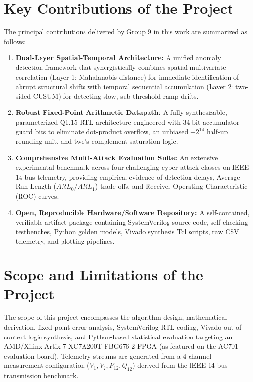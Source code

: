 \documentclass[11pt,a4paper]{report}
\begin{document}
\section{Key Contributions of the Project}
The principal contributions delivered by Group 9 in this work are summarized as follows:
\begin{enumerate}
    \item \textbf{Dual-Layer Spatial-Temporal Architecture:} A unified anomaly detection
    framework that synergistically combines spatial multivariate correlation (Layer 1:
    Mahalanobis distance) for immediate identification of abrupt structural shifts with
    temporal sequential accumulation (Layer 2: two-sided CUSUM) for detecting slow,
    sub-threshold ramp drifts.
    \item \textbf{Robust Fixed-Point Arithmetic Datapath:} A fully synthesizable,
    parameterized Q1.15 RTL architecture engineered with 34-bit accumulator guard bits
    to eliminate dot-product overflow, an unbiased $+2^{14}$ half-up rounding unit, and
    two's-complement saturation logic.
    \item \textbf{Comprehensive Multi-Attack Evaluation Suite:} An extensive experimental
    benchmark across four challenging cyber-attack classes on IEEE 14-bus telemetry,
    providing empirical evidence of detection delays, Average Run Length ($ARL_0/ARL_1$)
    trade-offs, and Receiver Operating Characteristic (ROC) curves.
    \item \textbf{Open, Reproducible Hardware/Software Repository:} A self-contained,
    verifiable artifact package containing SystemVerilog source code, self-checking
    testbenches, Python golden models, Vivado synthesis Tcl scripts, raw CSV telemetry,
    and plotting pipelines.
\end{enumerate}

\section{Scope and Limitations of the Project}
The scope of this project encompasses the algorithm design, mathematical derivation,
fixed-point error analysis, SystemVerilog RTL coding, Vivado out-of-context logic
synthesis, and Python-based statistical evaluation targeting an AMD/Xilinx Artix-7
XC7A200T-FBG676-2 FPGA (as featured on the AC701 evaluation board). Telemetry streams
are generated from a 4-channel measurement configuration ($V_1, V_2, P_{12}, Q_{12}$)
derived from the IEEE 14-bus transmission benchmark.
\end{document}
